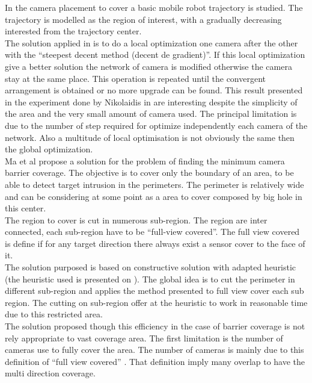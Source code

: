 In \cite{81*nikolaidis2009} the camera placement to cover a basic mobile robot trajectory is studied.
The trajectory is modelled as the region of interest, with a gradually decreasing interested from the trajectory center.\\
  The solution applied in  \cite{81*nikolaidis2009} is to do a local optimization one camera after the other with the “steepest decent method (decent de gradient)”. If this local optimization give a better solution the network of camera is modified otherwise the camera stay at the same place. This operation is repeated until the convergent arrangement is obtained or no more upgrade can be found. This result presented in the experiment done by Nikolaidis in  \cite{81*nikolaidis2009} are interesting despite the simplicity of the area and the very small amount of camera used.  The principal limitation is due to the number of step required for optimize independently each camera of the network. Also a multitude of local optimisation is not obviously the same then the global optimization.\\

Ma et al \cite{37*ma2012} propose a solution for the problem of finding the minimum camera barrier coverage. The objective is to cover only the boundary of an area, to be able to detect target intrusion in the perimeters. The perimeter is relatively wide and can be considering at some point as a area to cover composed by big hole in this center.\\
 The region to cover is cut in numerous sub-region. The region are inter connected, each sub-region have to be “full-view covered”. The full view covered is define if for any target direction there always exist a sensor cover to the face of it.\\
The solution purposed is based on constructive solution with adapted heuristic (the heuristic used is presented on \cite{37*ma2012}). The global idea is to cut the perimeter in different sub-region and applies the method presented to full view cover  each sub region. 
The cutting on sub-region offer at the heuristic to work in reasonable time due to this restricted area.\\
The solution proposed though this efficiency in the case of barrier coverage is not rely appropriate to vast coverage area. The first limitation is the number of cameras use to fully cover the area. The number of cameras is mainly due to this definition of “full view covered” . That definition  imply many overlap to have the multi direction coverage.\\


